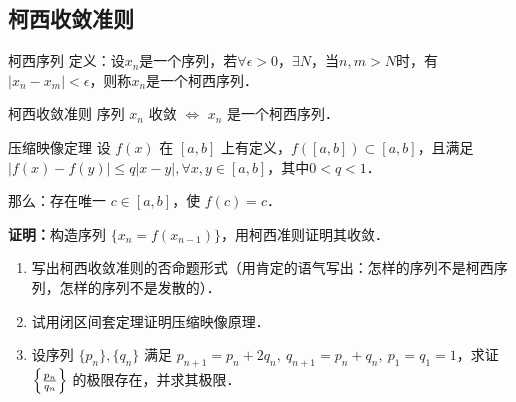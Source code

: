 \subsection{柯西收敛准则}
\begin{definition}{柯西序列}
定义：设{$x_n$}是一个序列，若$\forall\epsilon>0$，$\exists N$，当$n,m>N$时，有$\vert x_n-x_m\vert<\epsilon$，则称{$x_n$}是一个柯西序列．
\end{definition}
\begin{theorem}{柯西收敛准则}
序列 {$x_n$} 收敛 $\Leftrightarrow$ {$x_n$} 是一个柯西序列．
\end{theorem}
\begin{theorem}{压缩映像定理}
设 $f(x)$ 在 $[a,b]$ 上有定义，$f([a,b])\subset[a,b]$，且满足$|f(x)-f(y)|\leq q|x-y|,\forall x,y\in[a,b]$，其中$0<q<1$．

那么：存在唯一 $c\in[a,b]$，使 $f(c)=c$．
\end{theorem}
\textbf{证明：}构造序列 $\{x_n=f(x_{n-1})\}$，用柯西准则证明其收敛．

\begin{exercise}{}
\begin{enumerate}
\item 写出柯西收敛准则的否命题形式（用肯定的语气写出：怎样的序列不是柯西序列，怎样的序列不是发散的）．
\item 试用闭区间套定理证明压缩映像原理．
\item 设序列 $\{p_n\}, \{q_n\}$ 满足 $p_{n+1}=p_n+2q_n,\ q_{n+1}=p_n+q_n,\ p_1=q_1=1$，求证 $\left\{\large\frac{p_n}{q_n}\right\}$ 的极限存在，并求其极限．
\end{enumerate}
\end{exercise}